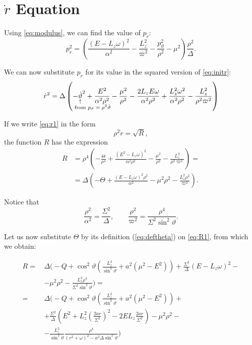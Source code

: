 \section{$\dot{r}$ Equation}

Using \autoref{eq:modulus}, we can find the value of $p_r$:
\[
	p_r^2 = \left( \frac{(E - L_z\omega)^2}{\alpha^2} - \frac{L_z^2}{\varpi^2} - \frac{p_\vartheta^2}{\rho^2} - \mu^2 \right) \frac{\rho^2}{\Delta}.
\]

We can now substitute $p_r$ for its value in the squared version of \autoref{eq:initr}:
\begin{equation}
	\label{eq:r1}
	\dot{r}^2 = \Delta \left( -\eqnote{\dot{\vartheta}}{from $p_\vartheta = \rho^2\dot{\vartheta}$}^2 + \frac{E^2}{\alpha^2\rho^2} - \frac{\mu^2}{\rho^2} - \frac{2L_zE\omega}{\alpha^2\rho^2} + \frac{L_z^2\omega^2}{\alpha^2\rho^2} - \frac{L_z^2}{\rho^2\varpi^2} \right)
\end{equation}

If we write \autoref{eq:r1} in the form
\[
	\rho^2 \dot{r} = \sqrt{R},
\]
the function $R$ has the expression
\begin{align}
	\nonumber
	R &= \rho^4 \left( -\frac{\Theta}{\rho^4} + \frac{(E^2 - L_z\omega)^2}{\alpha^2\rho^2} - \frac{\mu^2}{\rho^2} - \frac{L_z^2}{\rho^2\varpi^2} \right) = \\
	&= \Delta \left( -\Theta + \frac{(E-L_z\omega)^2\rho^2}{\alpha^2} - \mu^2\rho^2 - \frac{L_z^2 \rho^2}{\varpi^2} \right).
	\label{eq:R1}
\end{align}

Notice that
\[
	\frac{\rho^2}{\alpha^2} = \frac{\Sigma^2}{\Delta}, \qquad \frac{\rho^2}{\varpi^2} = \frac{\rho^4}{\Sigma^2 \sin^2\vartheta}.
\]

Let us now substitute $\Theta$ by its definition (\autoref{eq:deftheta}) on \autoref{eq:R1}, from which we obtain:

\begin{align}
	R =\,& \Delta \biggl( -Q + \cos^2\vartheta\left( \frac{L_z^2}{\sin^2\vartheta} + a^2 (\mu^2 - E^2) \right) + \frac{\Sigma^2}{\Delta}(E - L_z\omega)^2 - \nonumber \\
	&- \mu^2\rho^2 - \frac{L_z^2\rho^4}{\Sigma^2\sin^2\vartheta} \biggr) = \nonumber \\
	=\,& \Delta \biggl( -Q + \cos^2\vartheta\left( \frac{L_z^2}{\sin^2\vartheta} + a^2 (\mu^2 - E^2) \right) + \nonumber \\
	&+ \frac{\Sigma^2}{\Delta}\left( E^2 + L_z^2\left( \frac{2ar}{\Sigma^2} \right)^2 - 2EL_z\frac{2ar}{\Sigma^2} \right)  - \mu^2\rho^2 - \nonumber \\
	&- \frac{L_z^2}{\sin^2\vartheta}\frac{\rho^4}{(r^2 + \omega)^2 - a^2\Delta\sin^2\vartheta} \biggr)
\end{align}


